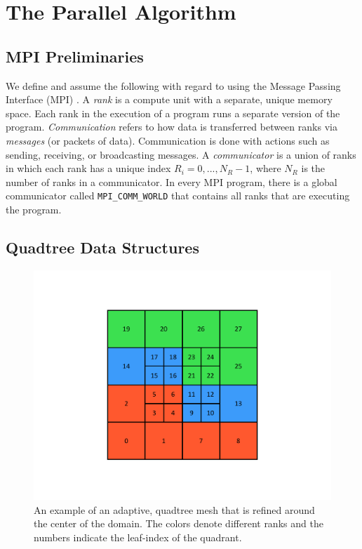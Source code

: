 \section{The Parallel Algorithm}
\label{sec:parallel-algorithm}

\subsection{MPI Preliminaries}

We define and assume the following with regard to using the Message Passing Interface (MPI) \citep{mpi40}. A {\em rank} is a compute unit with a separate, unique memory space. Each rank in the execution of a program runs a separate version of the program. {\em Communication} refers to how data is transferred between ranks via {\em messages} (or packets of data). Communication is done with actions such as sending, receiving, or broadcasting messages. A {\em communicator} is a union of ranks in which each rank has a unique index $R_i = 0, ..., N_{R}-1$, where $N_R$ is the number of ranks in a communicator. In every MPI program, there is a global communicator called {\tt MPI\_COMM\_WORLD} that contains all ranks that are executing the program.

\subsection{Quadtree Data Structures}
\label{sub:quadtree-data-structures}

\begin{figure}
    \centering
    \includegraphics[width=\textwidth, clip=true, trim={0 100 0 100}]{figures/parallel_adaptive_mesh_indexing.pdf}
    \caption{An example of an adaptive, quadtree mesh that is refined around the center of the domain. The colors denote different ranks and the numbers indicate the leaf-index of the quadrant.}
    \label{fig:adaptive_mesh}
\end{figure}

